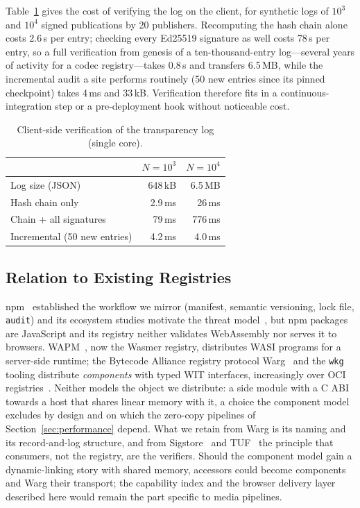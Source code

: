 Table~\ref{tab:reg-log} gives the cost of verifying the log on the client,
for synthetic logs of $10^3$ and $10^4$ signed publications by 20 publishers.
Recomputing the hash chain alone costs 2.6\,\textmu s per entry; checking
every Ed25519 signature as well costs 78\,\textmu s per entry, so a full
verification from genesis of a ten-thousand-entry log---several years of
activity for a codec registry---takes 0.8\,s and transfers 6.5\,MB, while
the incremental audit a site performs routinely (50 new entries since its
pinned checkpoint) takes 4\,ms and 33\,kB. Verification therefore fits in a
continuous-integration step or a pre-deployment hook without noticeable cost.

\begin{table}[t]
\caption{Client-side verification of the transparency log (single core).}
\label{tab:reg-log}
\centering\small
\begin{tabular}{lrr}
\toprule
 & $N = 10^3$ & $N = 10^4$ \\
\midrule
Log size (JSON)                 & 648\,kB & 6.5\,MB \\
Hash chain only                 & 2.9\,ms & 26\,ms \\
Chain + all signatures          & 79\,ms  & 776\,ms \\
Incremental (50 new entries)    & 4.2\,ms & 4.0\,ms \\
\bottomrule
\end{tabular}
\end{table}

\subsection{Relation to Existing Registries}
\label{sec:registry-related}

npm~\cite{npm} established the workflow we mirror (manifest, semantic
versioning, lock file, \texttt{audit}) and its ecosystem studies motivate the
threat model~\cite{zimmermann2019smallworld,ohm2020backstabber}, but npm
packages are JavaScript and its registry neither validates WebAssembly nor
serves it to browsers. WAPM~\cite{wapm}, now the Wasmer registry, distributes
WASI programs for a server-side runtime; the Bytecode Alliance registry
protocol Warg~\cite{warg} and the \texttt{wkg} tooling distribute
\emph{components} with typed WIT interfaces, increasingly over OCI
registries~\cite{oci-artifacts}. Neither models the object we distribute: a
side module with a C ABI towards a host that shares linear memory with it, a
choice the component model excludes by design and on which the zero-copy
pipelines of Section~\ref{sec:performance} depend. What we retain from Warg
is its naming and its record-and-log structure, and from
Sigstore~\cite{sigstore2022} and TUF~\cite{samuel2010tuf} the principle that
consumers, not the registry, are the verifiers. Should the component model
gain a dynamic-linking story with shared memory, accessors could become
components and Warg their transport; the capability index and the browser
delivery layer described here would remain the part specific to media
pipelines.
